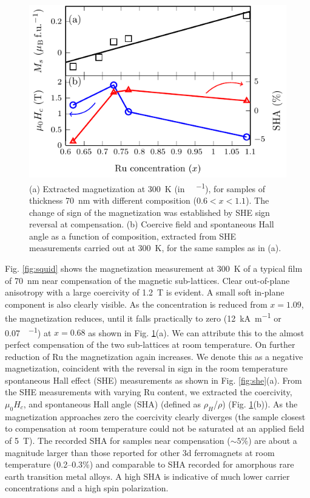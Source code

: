 \documentclass[reprint,aip,apl,floatfix,linenumbers,superscriptaddress]{revtex4-1}
\begin{document}
\begin{figure}
\includegraphics[width=1.0\columnwidth]{Transport-Fig3.pdf}
\caption{(a) Extracted magnetization at \SI{300}{\kelvin} (in \SI{}{\BohrMagneton\per\formulaunit}), for samples of thickness \SI{70}{\nano\metre} with different  composition ($0.6<x<1.1$). The change of sign of the magnetization was established by SHE sign reversal at compensation. (b) Coercive field  and spontaneous Hall angle as a function of  composition, extracted from SHE measurements carried out at \SI{300}{\kelvin}, for the same  samples as in (a).}
\label{fig:ru_conc}
\end{figure}

Fig. \ref{fig:squid} shows the magnetization measurement at \SI{300}{\kelvin} of a typical  film of \SI{70}{\nano\metre} near compensation of the magnetic sub-lattices. Clear out-of-plane anisotropy with a large coercivity of \SI{1.2}{\tesla} is evident.  A small soft in-plane component is also clearly visible. As the  concentration is reduced from $x=\num{1.09}$, the magnetization reduces, until it falls practically to zero (\SI{12}{\kilo\ampere\per\metre} or \SI{0.07}{\BohrMagneton\per\formulaunit}) at $x=\num{0.68}$ as shown in Fig. \ref{fig:ru_conc}(a). We can attribute this to the almost perfect compensation of the two  sub-lattices at room temperature. On further reduction of Ru the magnetization again increases. We denote this as a negative magnetization, coincident with the reversal in sign in the room temperature spontaneous Hall effect (SHE) measurements as shown in Fig. \ref{fig:she}(a). From the SHE measurements with varying Ru content, we extracted the coercivity, $\mu_0H_c$, and spontaneous Hall angle (SHA) (defined as $\rho_H$/$\rho$) (Fig. \ref{fig:ru_conc}(b)). As the magnetization approaches zero the coercivity clearly diverges (the sample closest to compensation at room temperature could not be saturated at an applied field of \SI{5}{\tesla}). The recorded SHA for samples near compensation ($\sim \num{5}\%$) are about a magnitude larger than those reported for other 3d ferromagnets at room temperature (\numrange{0.2}{0.3}\%)\cite{dorleijn1976} and comparable to SHA recorded for amorphous rare earth transition metal alloys\cite{Kim2001}. A high SHA is indicative of much lower carrier concentrations and a high spin polarization.
\end{document}
